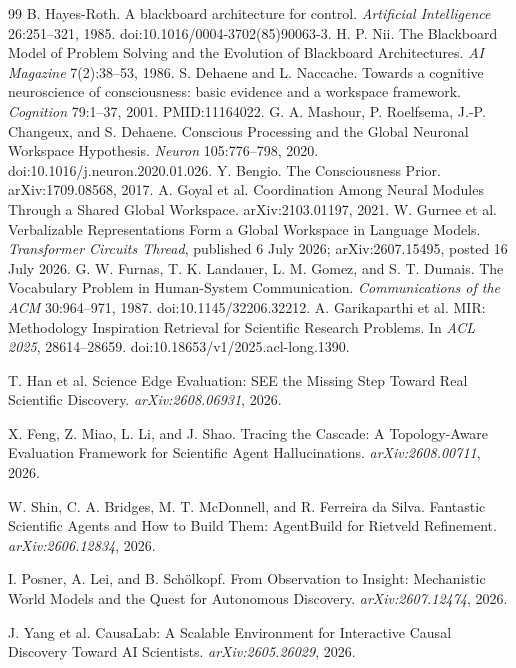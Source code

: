 \begin{thebibliography}{99}
 B. Hayes-Roth. A blackboard architecture for control. \emph{Artificial Intelligence} 26:251--321, 1985. doi:10.1016/0004-3702(85)90063-3.
 H. P. Nii. The Blackboard Model of Problem Solving and the Evolution of Blackboard Architectures. \emph{AI Magazine} 7(2):38--53, 1986.
 S. Dehaene and L. Naccache. Towards a cognitive neuroscience of consciousness: basic evidence and a workspace framework. \emph{Cognition} 79:1--37, 2001. PMID:11164022.
 G. A. Mashour, P. Roelfsema, J.-P. Changeux, and S. Dehaene. Conscious Processing and the Global Neuronal Workspace Hypothesis. \emph{Neuron} 105:776--798, 2020. doi:10.1016/j.neuron.2020.01.026.
 Y. Bengio. The Consciousness Prior. arXiv:1709.08568, 2017.
 A. Goyal et al. Coordination Among Neural Modules Through a Shared Global Workspace. arXiv:2103.01197, 2021.
 W. Gurnee et al. Verbalizable Representations Form a Global Workspace in Language Models. \emph{Transformer Circuits Thread}, published 6 July 2026; arXiv:2607.15495, posted 16 July 2026.
 G. W. Furnas, T. K. Landauer, L. M. Gomez, and S. T. Dumais. The Vocabulary Problem in Human-System Communication. \emph{Communications of the ACM} 30:964--971, 1987. doi:10.1145/32206.32212.
 A. Garikaparthi et al. MIR: Methodology Inspiration Retrieval for Scientific Research Problems. In \emph{ACL 2025}, 28614--28659. doi:10.18653/v1/2025.acl-long.1390.

T. Han et al. Science Edge Evaluation: SEE the Missing Step Toward Real Scientific Discovery. \emph{arXiv:2608.06931}, 2026.

X. Feng, Z. Miao, L. Li, and J. Shao. Tracing the Cascade: A Topology-Aware Evaluation Framework for Scientific Agent Hallucinations. \emph{arXiv:2608.00711}, 2026.

W. Shin, C. A. Bridges, M. T. McDonnell, and R. Ferreira da Silva. Fantastic Scientific Agents and How to Build Them: AgentBuild for Rietveld Refinement. \emph{arXiv:2606.12834}, 2026.

I. Posner, A. Lei, and B. Sch\"olkopf. From Observation to Insight: Mechanistic World Models and the Quest for Autonomous Discovery. \emph{arXiv:2607.12474}, 2026.

J. Yang et al. CausaLab: A Scalable Environment for Interactive Causal Discovery Toward AI Scientists. \emph{arXiv:2605.26029}, 2026.


\end{thebibliography}
